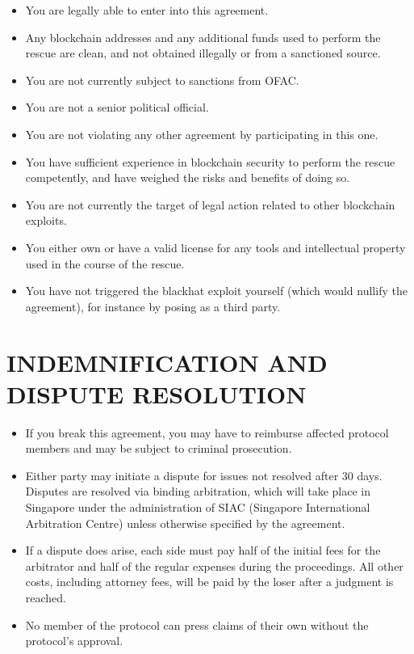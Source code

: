 \documentclass{article}
\begin{document}
\begin{itemize}
    \item You are legally able to enter into this agreement.
    \item Any blockchain addresses and any additional funds used to perform the rescue are clean, and not obtained illegally or from a sanctioned source.
    \item You are not currently subject to sanctions from OFAC.
    \item You are not a senior political official.
    \item You are not violating any other agreement by participating in this one.
    \item You have sufficient experience in blockchain security to perform the rescue competently, and have weighed the risks and benefits of doing so.
    \item You are not currently the target of legal action related to other blockchain exploits.
    \item You either own or have a valid license for any tools and intellectual property used in the course of the rescue.
    \item You have not triggered the blackhat exploit yourself (which would nullify the agreement), for instance by posing as a third party.
\end{itemize}

\section{INDEMNIFICATION AND DISPUTE RESOLUTION}

\begin{itemize}
    \item If you break this agreement, you may have to reimburse affected protocol members and may be subject to criminal prosecution.
    \item Either party may initiate a dispute for issues not resolved after 30 days. Disputes are resolved via binding arbitration, which will take place in Singapore under the administration of SIAC (Singapore International Arbitration Centre) unless otherwise specified by the agreement.
    \item If a dispute does arise, each side must pay half of the initial fees for the arbitrator and half of the regular expenses during the proceedings. All other costs, including attorney fees, will be paid by the loser after a judgment is reached.
    \item No member of the protocol can press claims of their own without the protocol's approval.
\end{itemize}
\end{document}
